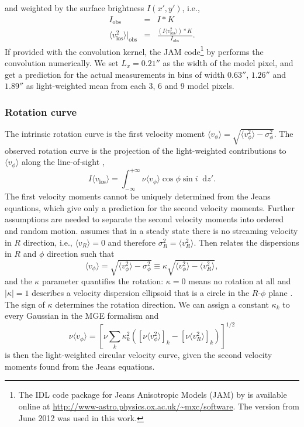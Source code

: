 \documentclass[useAMS,usenatbib]{mnras}
\newcommand*\diff{\mathop{}\!\mathrm{d}}
\begin{document}
and weighted by the surface brightness $I(x',y')$, i.e.,
\begin{eqnarray*}
I_\text{obs} &=& I \ast K\\
\langle v_\text{los}^2 \rangle |_\text{obs} &=& \frac{(I \langle v_\text{los}^2\rangle) \ast K}{I_\text{obs}}.
\end{eqnarray*}
If provided with the convolution kernel, the JAM code\footnote{The IDL code package for Jeans Anisotropic Models (JAM) by \citet{Cap08} is available online at \url{http://www-astro.physics.ox.ac.uk/~mxc/software}. The version from June 2012 was used in this work.} by \citet{Cap08} performs the convolution numerically. We set $L_x = 0.21''$ as the width of the model pixel, and get a prediction for the actual measurements in bins of width $0.63''$, $1.26''$ and $1.89''$ \citep{SWELLSV} as light-weighted mean from each 3, 6 and 9 model pixels.


\subsubsection{Rotation curve}

The intrinsic rotation curve is the first velocity moment $\langle v_\phi\rangle = \sqrt{\langle v_\phi^2 \rangle - \sigma_\phi^2}$. The observed rotation curve is the projection of the light-weighted contributions to $\langle v_\phi\rangle$ along the line-of-sight \citep{Cap08},
\begin{equation*}
I \langle v_\text{los}\rangle = \int_{-\infty}^{+\infty} \nu \langle v_\phi\rangle \cos \phi \sin i \diff z'.
\end{equation*}
The first velocity moments cannot be uniquely determined from the Jeans equations, which give only a prediction for the second velocity moments. Further assumptions are needed to separate the second velocity moments into ordered and random motion. \citet{Cap08} assumes that in a steady state there is no streaming velocity in $R$ direction, i.e., $\langle v_R \rangle = 0$ and therefore $\sigma_R^2 = \langle v_R^2 \rangle$. Then \citet{Cap08} relates the dispersions in $R$ and $\phi$ direction such that
$$\langle v_\phi\rangle = \sqrt{\langle v_\phi^2 \rangle - \sigma_\phi^2} \equiv \kappa \sqrt{\langle v_\phi^2 \rangle - \langle v_R^2 \rangle},$$
and the $\kappa$ parameter quantifies the rotation: $\kappa = 0$ means no rotation at all and $|\kappa| = 1$ describes a velocity dispersion ellipsoid that is a circle in the $R$-$\phi$ plane \citep{Cap08}. The sign of $\kappa$ determines the rotation direction. We can assign a constant $\kappa_k$ to every Gaussian in the MGE formalism and
\begin{equation*}
\nu \langle v_\phi\rangle = \left[\nu \sum_{k} \kappa_k^2 \left( [\nu\langle v_\phi^2 \rangle]_k - [\nu\langle v_R^2 \rangle]_k\right) \right]^{1/2}
\end{equation*} 
is then the light-weighted circular velocity curve, given the second velocity moments found from the Jeans equations.
\end{document}
